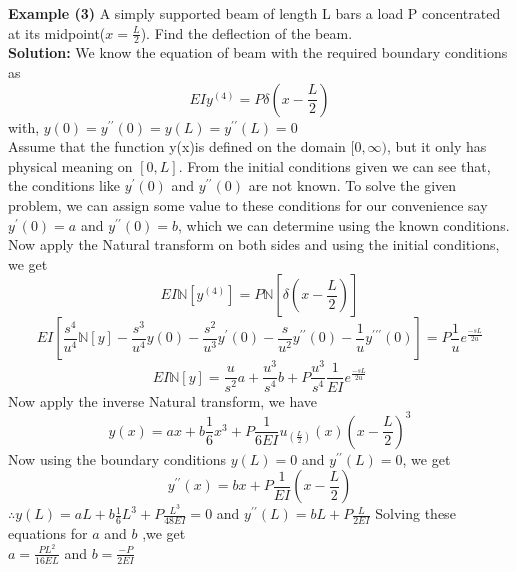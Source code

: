 \textbf{Example (3)} A simply supported beam of length L bars a load P concentrated at its midpoint($x=\frac{L}{2}$). Find the deflection of the beam.\\
\textbf{Solution:} We know the equation of beam with the required boundary conditions as
\begin{equation}
EIy^{(4)}=P\delta(x-\frac{L}{2})
\end{equation}
with, $y(0)=y^{\prime\prime}(0)=y(L)=y^{\prime\prime}(L)=0$\\
Assume that the function y(x)is defined on the domain $ [ 0,\infty)$, but it only has physical meaning on $ [ 0,L]$. From the initial conditions given we can see that, the conditions like $y^{\prime}(0)$ and $y^{\prime\prime}(0)$ are not known. To solve the given problem, we can assign some value to these conditions for our convenience say $y^{\prime}(0)= a$ and $y^{\prime\prime}(0)=b$, which we can determine using the known conditions.\\
Now apply the Natural transform on both sides and using the initial conditions, we get
\begin{equation*}
EI\mathbb{N}[y^{(4)}]=P\mathbb{N}[\delta(x-\frac{L}{2})]
\end{equation*}
\begin{equation*}
EI[\frac{s^{4}}{u^{4}}\mathbb{N}[y]-\frac{s^{3}}{u^{4}}y(0)-\frac{s^{2}}{u^{3}}y^{\prime}(0)-\frac{s}{u^{2}}y^{\prime\prime}(0)-\frac{1}{u}y^{\prime\prime\prime}(0)]=P\frac{1}{u}e^{\frac{-sL}{2u}}
\end{equation*}
\begin{equation*}
EI\mathbb{N}[y]=\frac{u}{s^2}a+\frac{u^{3}}{s^{4}}b+P\frac{u^{3}}{s^{4}}\frac{1}{EI}e^{\frac{-sL}{2u}}
\end{equation*}
Now apply the inverse Natural transform, we have
\begin{equation}
y(x)=ax+b\frac{1}{6}x^{3}+P\frac{1}{6EI}u_{(\frac{L}{2})}(x)(x-\frac{L}{2})^{3}
\end{equation}
Now using the boundary conditions $y(L)=0$ and $y^{\prime\prime}(L)=0$, we get
\begin{equation}
y^{\prime\prime}(x)=bx+P\frac{1}{EI}(x-\frac{L}{2})
\end{equation}
$\therefore y(L)=aL+b\frac{1}{6}L^{3}+P\frac{L^3}{48EI}=0$ \hspace{0.25cm}   and \hspace{0.25cm}
$y^{\prime\prime}(L)=bL+P\frac{L}{2EI}$
Solving these equations for $a$ and $b$ ,we get\\
$ a=\frac{PL^2}{16EL} $ and $ b=\frac{-P}{2EI} $\\

